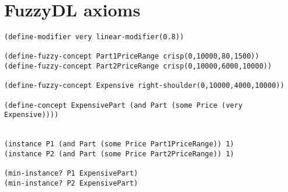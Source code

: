 \documentclass[a4paper,12pt]{report}
\begin{document}
\section{FuzzyDL axioms}
\lstset{style=mystyle}
\begin{lstlisting}
(define-modifier very linear-modifier(0.8))

(define-fuzzy-concept Part1PriceRange crisp(0,10000,80,1500))
(define-fuzzy-concept Part2PriceRange crisp(0,10000,6000,10000))

(define-fuzzy-concept Expensive right-shoulder(0,10000,4000,10000))

(define-concept ExpensivePart (and Part (some Price (very Expensive)))) 


(instance P1 (and Part (some Price Part1PriceRange)) 1)
(instance P2 (and Part (some Price Part2PriceRange)) 1)

(min-instance? P1 ExpensivePart)
(min-instance? P2 ExpensivePart)
\end{lstlisting}
\end{document}
